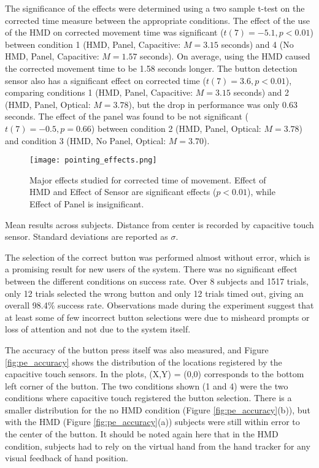 The significance of the effects were determined using a two sample t-test on the corrected time measure between the appropriate conditions.
The effect of the use of the HMD on corrected movement time was significant ($t(7)=-5.1, p < 0.01$) between condition 1 (HMD, Panel, Capacitive: $M=3.15$ seconds) and 4 (No HMD, Panel, Capacitive: $M=1.57$ seconds).
On average, using the HMD caused the corrected movement time to be 1.58 seconds longer.
The button detection sensor also has a significant effect on corrected time ($t(7)=3.6, p < 0.01$), comparing conditions 1 (HMD, Panel, Capacitive: $M=3.15$ seconds) and 2 (HMD, Panel, Optical: $M=3.78$), but the drop in performance was only 0.63 seconds.
The effect of the panel was found to be not significant ($t(7)=-0.5, p=0.66$) between condition 2 (HMD, Panel, Optical: $M=3.78$) and condition 3 (HMD, No Panel, Optical: $M=3.70$).

\begin{figure}
    \centering
    \texttt{[image: pointing\_effects.png]}
    \caption{Major effects studied for corrected time of movement. Effect of HMD and Effect of Sensor are significant effects ($p<0.01$), while Effect of Panel is insignificant.}
    \label{fig:pe_effects}
\end{figure}

\begin{table}
    \centering
    \caption{Mean results across subjects. Distance from center is recorded by capacitive touch sensor. Standard deviations are reported as $\sigma$.}
    \label{tab:pe_results}
\end{table}

The selection of the correct button was performed almost without error, which is a promising result for new users of the system.
There was no significant effect between the different conditions on success rate.
Over 8 subjects and 1517 trials, only 12 trials selected the wrong button and only 12 trials timed out, giving an overall 98.4\% success rate.
Observations made during the experiment suggest that at least some of few incorrect button selections were due to misheard prompts or loss of attention and not due to the system itself.

The accuracy of the button press itself was also measured, and Figure \ref{fig:pe_accuracy} shows the distribution of the locations registered by the capacitive touch sensors.
In the plots, (X,Y) = (0,0) corresponds to the bottom left corner of the button.
The two conditions shown (1 and 4) were the two conditions where capacitive touch registered the button selection.
There is a smaller distribution for the no HMD condition (Figure \ref{fig:pe_accuracy}(b)), but with the HMD (Figure \ref{fig:pe_accuracy}(a)) subjects were still within error to the center of the button.
It should be noted again here that in the HMD condition, subjects had to rely on the virtual hand from the hand tracker for any visual feedback of hand position.

